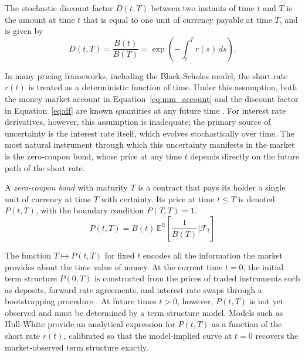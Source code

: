     \begin{definition}
        The stochastic discount factor $D(t,T)$ between two instants of time $t$ and $T$ is the amount at time $t$ that is equal to one unit of currency payable at time $T$, and is given by
        \begin{equation} \label{eq:df}
          D(t,T) = \frac{B(t)}{B(T)} = \exp\left( -\int_{t}^{T} r(s) \, ds\right).
        \end{equation}
    \end{definition}
    
    \noindent
    In many pricing frameworks, including the Black-Scholes model, the short rate $r(t)$ is treated as a deterministic function of time. Under this assumption, both the money market account in
    Equation~\eqref{eq:mm_account} and the discount factor in Equation~\eqref{eq:df} are known quantities at any future time \cite{BrigoMercurio2006}. For interest rate derivatives, however, this assumption is inadequate; the primary source of uncertainty is the interest rate itself, which evolves stochastically over time. The most natural instrument through which this uncertainty manifests in the market is the zero-coupon bond, whose price at any time $t$ depends directly on the future path of the short rate.\\
    
    \begin{definition}
    A \textit{zero-coupon bond} with maturity $T$ is a contract that pays its holder a single unit of currency at time $T$ with certainty. Its price at time $t \leq T$ is denoted $P(t,T)$, with the boundary condition $P(T,T) = 1$.
        \begin{equation} \label{eq:zcb}
          P(t,T) = B(t) \, \mathbb{E}^{\mathbb{Q}} \left[ \frac{1}{B(T)} \bigg| \mathcal{F}_t \right]
        \end{equation}
    \end{definition}
    
    \noindent
    The function $T \mapsto P(t,T)$ for fixed $t$ encodes all the information the market provides about the time value of money. At the current time $t = 0$, the initial term structure $P(0,T)$ is constructed from the prices of traded instruments such as deposits, forward rate agreements, and interest rate swaps through a bootstrapping procedure \cite{Hull2022, Tuckman2011}. At future times $t > 0$, however, $P(t,T)$ is not yet observed and must be determined by a term structure model. Models such as Hull-White \cite{HullWhite1990} provide an analytical expression for $P(t,T)$ as a function of the short rate $r(t)$, calibrated so that the model-implied curve at $t = 0$ recovers the market-observed term structure exactly. \\

